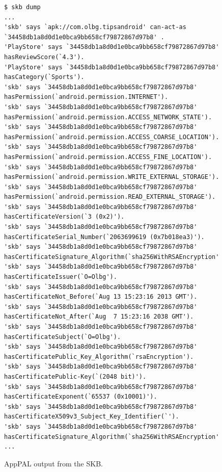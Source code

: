 \documentclass[a4paper]{scrartcl}
\begin{document}
\begin{figure}
  \centering
  \begin{Verbatim}[fontsize=\tiny]
$ skb dump
...
'skb' says `apk://com.olbg.tipsandroid' can-act-as `34458db1a8d0d1e0bca9bb658cf79872867d97b8' .
'PlayStore' says `34458db1a8d0d1e0bca9bb658cf79872867d97b8' hasReviewScore(`4.3').
'PlayStore' says `34458db1a8d0d1e0bca9bb658cf79872867d97b8' hasCategory(`Sports').
'skb' says `34458db1a8d0d1e0bca9bb658cf79872867d97b8' hasPermission(`android.permission.INTERNET').
'skb' says `34458db1a8d0d1e0bca9bb658cf79872867d97b8' hasPermission(`android.permission.ACCESS_NETWORK_STATE').
'skb' says `34458db1a8d0d1e0bca9bb658cf79872867d97b8' hasPermission(`android.permission.ACCESS_COARSE_LOCATION').
'skb' says `34458db1a8d0d1e0bca9bb658cf79872867d97b8' hasPermission(`android.permission.ACCESS_FINE_LOCATION').
'skb' says `34458db1a8d0d1e0bca9bb658cf79872867d97b8' hasPermission(`android.permission.WRITE_EXTERNAL_STORAGE').
'skb' says `34458db1a8d0d1e0bca9bb658cf79872867d97b8' hasPermission(`android.permission.READ_EXTERNAL_STORAGE').
'skb' says `34458db1a8d0d1e0bca9bb658cf79872867d97b8' hasCertificateVersion(`3 (0x2)').
'skb' says `34458db1a8d0d1e0bca9bb658cf79872867d97b8' hasCertificateSerial_Number(`2063699619 (0x7b018ea3)').
'skb' says `34458db1a8d0d1e0bca9bb658cf79872867d97b8' hasCertificateSignature_Algorithm(`sha256WithRSAEncryption').
'skb' says `34458db1a8d0d1e0bca9bb658cf79872867d97b8' hasCertificateIssuer(`O=Olbg').
'skb' says `34458db1a8d0d1e0bca9bb658cf79872867d97b8' hasCertificateNot_Before(`Aug 13 15:23:16 2013 GMT').
'skb' says `34458db1a8d0d1e0bca9bb658cf79872867d97b8' hasCertificateNot_After(`Aug  7 15:23:16 2038 GMT').
'skb' says `34458db1a8d0d1e0bca9bb658cf79872867d97b8' hasCertificateSubject(`O=Olbg').
'skb' says `34458db1a8d0d1e0bca9bb658cf79872867d97b8' hasCertificatePublic_Key_Algorithm(`rsaEncryption').
'skb' says `34458db1a8d0d1e0bca9bb658cf79872867d97b8' hasCertificatePublic-Key(`(2048 bit)').
'skb' says `34458db1a8d0d1e0bca9bb658cf79872867d97b8' hasCertificateExponent(`65537 (0x10001)').
'skb' says `34458db1a8d0d1e0bca9bb658cf79872867d97b8' hasCertificateX509v3_Subject_Key_Identifier(`').
'skb' says `34458db1a8d0d1e0bca9bb658cf79872867d97b8' hasCertificateSignature_Algorithm(`sha256WithRSAEncryption').
...
  \end{Verbatim}
  \caption{AppPAL output from the \ac{SKB}.}
  \label{fig:dump}
\end{figure}
\end{document}
